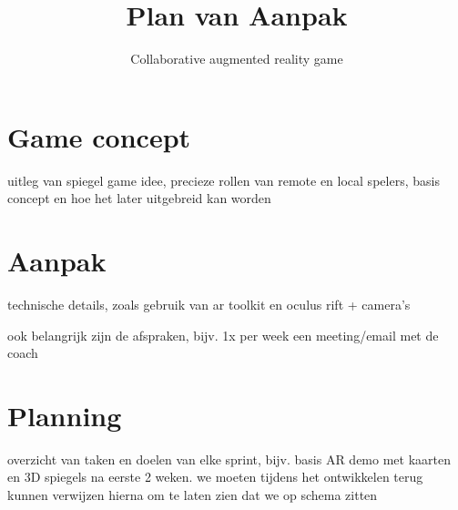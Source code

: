 \documentclass[11pt] {article}
\title{Plan van Aanpak}
\author{Collaborative augmented reality game}
\date{}
\begin{document}
\maketitle

\section{Game concept}

uitleg van spiegel game idee, precieze rollen van remote en local spelers, basis concept en hoe het later uitgebreid kan worden

\section{Aanpak}

technische details, zoals gebruik van ar toolkit en oculus rift + camera's

ook belangrijk zijn de afspraken, bijv. 1x per week een meeting/email met de coach

\section{Planning}

overzicht van taken en doelen van elke sprint, bijv. basis AR demo met kaarten en 3D spiegels na eerste 2 weken. we moeten tijdens het ontwikkelen terug kunnen verwijzen hierna om te laten zien dat we op schema zitten
\end{document}
